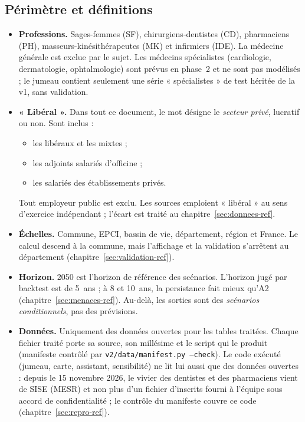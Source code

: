 \subsection{Périmètre et définitions}\label{int:perimetre}
\begin{itemize}
\item \textbf{Professions.} Sages-femmes (SF), chirurgiens-dentistes (CD), pharmaciens (PH),
  masseurs-kinésithérapeutes (MK) et infirmiers (IDE). La médecine générale est exclue par le sujet. Les médecins
  spécialistes (cardiologie, dermatologie, ophtalmologie) sont prévus en phase~2 et ne sont pas modélisés ; le
  jumeau contient seulement une série « spécialistes » de test héritée de la v1, sans validation.
\item \textbf{« Libéral ».} Dans tout ce document, le mot désigne le \emph{secteur privé}, lucratif ou non. Sont
  inclus :
  \begin{itemize}
  \item les libéraux et les mixtes ;
  \item les adjoints salariés d'officine ;
  \item les salariés des établissements privés.
  \end{itemize}
  Tout employeur public est exclu. Les sources emploient « libéral » au sens d'exercice indépendant ; l'écart est
  traité au chapitre~\ref{sec:donnees-ref}.
\item \textbf{Échelles.} Commune, EPCI, bassin de vie, département, région et France. Le calcul descend à la
  commune, mais l'affichage et la validation s'arrêtent au département (chapitre~\ref{sec:validation-ref}).
\item \textbf{Horizon.} 2050 est l'horizon de référence des scénarios. L'horizon jugé par backtest est de
  5~ans ; à 8 et 10~ans, la persistance fait mieux qu'A2\mesure{} (chapitre~\ref{sec:menaces-ref}). Au-delà, les
  sorties sont des \emph{scénarios conditionnels}, pas des prévisions.
\item \textbf{Données.} Uniquement des données ouvertes pour les tables traitées. Chaque fichier traité porte sa
  source, son millésime et le script qui le produit (manifeste contrôlé par \texttt{v2/data/manifest.py --check}).
  Le code exécuté (jumeau, carte, assistant, sensibilité) ne lit lui aussi que des données ouvertes : depuis le
  15 novembre 2026, le vivier des dentistes et des pharmaciens vient de SISE (MESR) et non plus d'un fichier
  d'inscrits fourni à l'équipe sous accord de confidentialité ; le contrôle du manifeste couvre ce code
  (chapitre~\ref{sec:repro-ref}).
\end{itemize}

